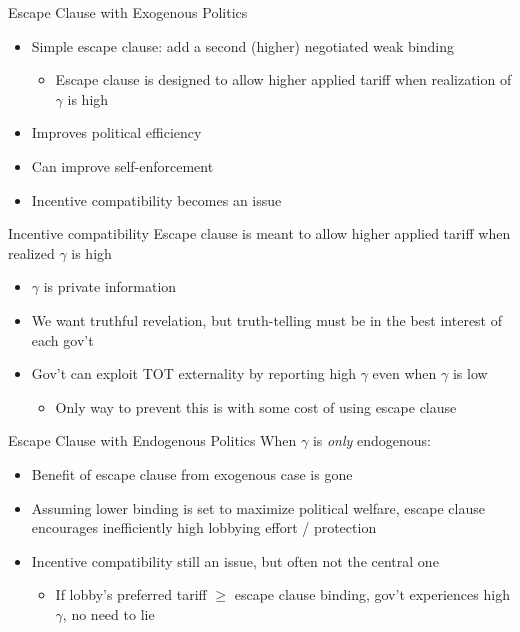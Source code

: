 \documentclass[handout]{beamer}
\newcommand{\ga}{\gamma}
\begin{document}
{\begin{frame}{Escape Clause with Exogenous Politics}
\pause
\begin{itemize}[<+->]
	\item Simple escape clause: add a second (higher) negotiated weak binding
		\begin{itemize}
			\item Escape clause is designed to allow higher applied tariff when realization of $\ga$ is high
		\end{itemize}
	\item Improves political efficiency
	\item Can improve self-enforcement
	\item Incentive compatibility becomes an issue
\end{itemize}
\end{frame}


\begin{frame}{Incentive compatibility}
\pause
Escape clause is meant to allow higher applied tariff when realized $\ga$ is high
\pause
\begin{itemize}[<+->]
	\item $\ga$ is private information
	\item We want truthful revelation, but truth-telling must be in the best interest of each gov't
	\item Gov't can exploit TOT externality by reporting high $\ga$ even when $\ga$ is low
		\begin{itemize}
			\item Only way to prevent this is with some cost of using escape clause
		\end{itemize}
	\end{itemize}
\end{frame}


\begin{frame}{Escape Clause with Endogenous Politics}
When $\ga$ is \textit{only} endogenous:
\pause
\begin{itemize}[<+->]
	\item Benefit of escape clause from exogenous case is gone
	\item Assuming lower binding is set to maximize political welfare, escape clause encourages inefficiently high lobbying effort / protection
	\item Incentive compatibility still an issue, but often not the central one
		\begin{itemize}[<+->]
			\item If lobby's preferred tariff $\geq$ escape clause binding, gov't experiences high $\ga$, no need to lie
		\end{itemize}
  \end{itemize}
	

\end{frame}}
\end{document}
